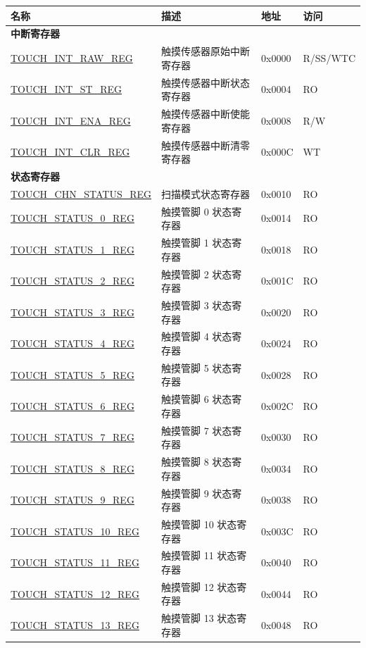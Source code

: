 \begin{longtable}{ | l | p{8cm} | p{1.3cm} | p{1.7cm} | }
\hline\rowcolor{lightgray}
\textbf{名称} & \textbf{描述} & \textbf{地址} & \textbf{访问} \\ \hline
\endhead
\multicolumn{4}{|l|}{\textbf{中断寄存器}} \\ \hline
\hyperref[regdesc:TOUCHINTRAWREG]{TOUCH\_INT\_RAW\_REG} & 触摸传感器原始中断寄存器 & 0x0000 & R/SS/WTC \\ \hline
\hyperref[regdesc:TOUCHINTSTREG]{TOUCH\_INT\_ST\_REG} & 触摸传感器中断状态寄存器 & 0x0004 & RO \\ \hline
\hyperref[regdesc:TOUCHINTENAREG]{TOUCH\_INT\_ENA\_REG} & 触摸传感器中断使能寄存器 & 0x0008 & R/W \\ \hline
\hyperref[regdesc:TOUCHINTCLRREG]{TOUCH\_INT\_CLR\_REG} & 触摸传感器中断清零寄存器 & 0x000C & WT \\ \hline
\multicolumn{4}{|l|}{\textbf{状态寄存器}} \\ \hline
\hyperref[regdesc:TOUCHCHNSTATUSREG]{TOUCH\_CHN\_STATUS\_REG} & 扫描模式状态寄存器 & 0x0010 & RO \\ \hline
\hyperref[regdesc:TOUCHSTATUS0REG]{TOUCH\_STATUS\_0\_REG} & 触摸管脚 0 状态寄存器 & 0x0014 & RO \\ \hline
\hyperref[regdesc:TOUCHSTATUS0REG]{TOUCH\_STATUS\_1\_REG} & 触摸管脚 1 状态寄存器 & 0x0018 & RO \\ \hline
\hyperref[regdesc:TOUCHSTATUS0REG]{TOUCH\_STATUS\_2\_REG} & 触摸管脚 2 状态寄存器 & 0x001C & RO \\ \hline
\hyperref[regdesc:TOUCHSTATUS0REG]{TOUCH\_STATUS\_3\_REG} & 触摸管脚 3 状态寄存器 & 0x0020 & RO \\ \hline
\hyperref[regdesc:TOUCHSTATUS0REG]{TOUCH\_STATUS\_4\_REG} & 触摸管脚 4 状态寄存器 & 0x0024 & RO \\ \hline
\hyperref[regdesc:TOUCHSTATUS0REG]{TOUCH\_STATUS\_5\_REG} & 触摸管脚 5 状态寄存器 & 0x0028 & RO \\ \hline
\hyperref[regdesc:TOUCHSTATUS0REG]{TOUCH\_STATUS\_6\_REG} & 触摸管脚 6 状态寄存器 & 0x002C & RO \\ \hline
\hyperref[regdesc:TOUCHSTATUS0REG]{TOUCH\_STATUS\_7\_REG} & 触摸管脚 7 状态寄存器 & 0x0030 & RO \\ \hline
\hyperref[regdesc:TOUCHSTATUS0REG]{TOUCH\_STATUS\_8\_REG} & 触摸管脚 8 状态寄存器 & 0x0034 & RO \\ \hline
\hyperref[regdesc:TOUCHSTATUS0REG]{TOUCH\_STATUS\_9\_REG} & 触摸管脚 9 状态寄存器 & 0x0038 & RO \\ \hline
\hyperref[regdesc:TOUCHSTATUS0REG]{TOUCH\_STATUS\_10\_REG} & 触摸管脚 10 状态寄存器 & 0x003C & RO \\ \hline
\hyperref[regdesc:TOUCHSTATUS0REG]{TOUCH\_STATUS\_11\_REG} & 触摸管脚 11 状态寄存器 & 0x0040 & RO \\ \hline
\hyperref[regdesc:TOUCHSTATUS0REG]{TOUCH\_STATUS\_12\_REG} & 触摸管脚 12 状态寄存器 & 0x0044 & RO \\ \hline
\hyperref[regdesc:TOUCHSTATUS0REG]{TOUCH\_STATUS\_13\_REG} & 触摸管脚 13 状态寄存器 & 0x0048 & RO \\ \hline


\end{longtable}
